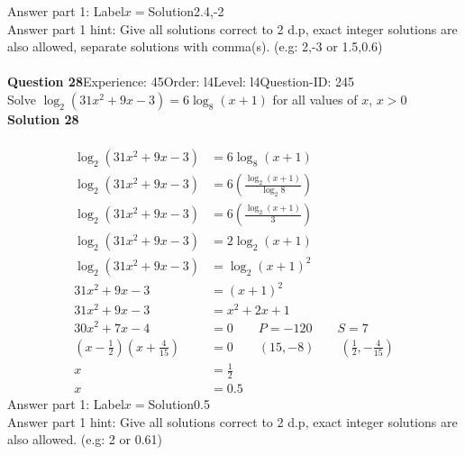 \documentclass{article}
\begin{document}
Answer part 1: \hspace{10pt}Label\hspace{10pt}$x=$\hspace{10pt}Solution\hspace{10pt}2.4,-2\\
Answer part 1 hint: \hspace{15pt} Give all solutions correct to 2 d.p, exact integer solutions are also allowed, separate solutions with comma(s). (e.g: 2,-3 or 1.5,0.6)\\
\\[4pt]
\noindent\textbf{Question 28}\hspace{20pt}Experience: 45\hspace{20pt}Order: l4\hspace{20pt}Level: l4\hspace{20pt}Question-ID: 245\\[2pt]
Solve $\log_{2}(31x^2+9x-3)=6\log_{8}(x+1)$ for all values of $x$, $x>0$\\[4pt]
\noindent\textbf{Solution 28}\\[2pt]
\\[-35pt]\begin{align*}
\log_{2}(31x^2+9x-3)&=6\log_{8}(x+1)\\[2pt]
\log_{2}(31x^2+9x-3)&=6\left(\displaystyle\frac{\log_{2}(x+1)}{\log_{2}8}\right)\\[2pt]
\log_{2}(31x^2+9x-3)&=6\left(\displaystyle\frac{\log_{2}(x+1)}{3}\right)\\[2pt]
\log_{2}(31x^2+9x-3)&=2\log_{2}(x+1)\\[2pt]
\log_{2}(31x^2+9x-3)&=\log_{2}(x+1)^2\\[2pt]
31x^2+9x-3&=(x+1)^2\\[2pt]
31x^2+9x-3&=x^2+2x+1\\[2pt]
30x^2+7x-4&=0\qquad P=-120 \qquad S=7\\[2pt]
\left(x-\displaystyle\frac{1}{2}\right)\left(x+\displaystyle\frac{4}{15}\right)&=0\qquad (15,-8)\qquad\left(\displaystyle\frac{1}{2},-\displaystyle\frac{4}{15}\right)\\[2pt]
x&=\displaystyle\frac{1}{2}\\[2pt]
x&=0.5
\end{align*}
Answer part 1: \hspace{10pt}Label\hspace{10pt}$x=$\hspace{10pt}Solution\hspace{10pt}0.5\\
Answer part 1 hint: \hspace{15pt}Give all solutions correct to 2 d.p, exact integer solutions are also allowed. (e.g: 2 or 0.61)\\
\end{document}
